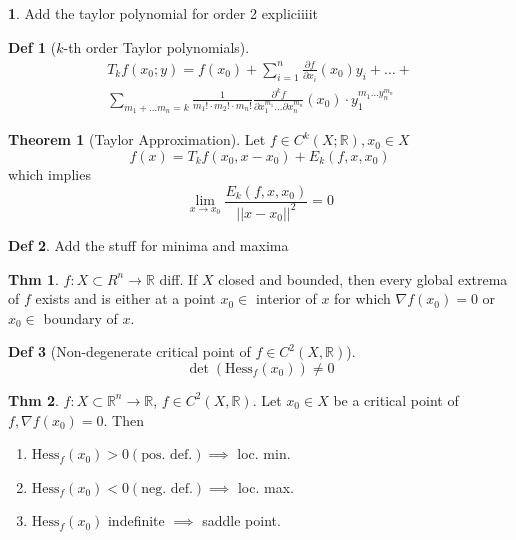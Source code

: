 \documentclass[a4paper, 10pt]{article}
\theoremstyle{definition}
\newtheorem*{theorem}{Thm}
\newtheorem*{definition}{Def}
\theoremstyle{colored}
\newtheorem*{note_wrapper}{}
\theoremstyle{ex}
\theoremstyle{named}
\newtheorem*{ntheorem_wrapper}{Theorem}
\newenvironment{ntheorem}%
    {\begin{mdframed}[style=important]\begin{ntheorem_wrapper}}%
    {\end{ntheorem_wrapper}\end{mdframed}}
\newenvironment{note}%
    {\begin{mdframed}[style=trick]\begin{note_wrapper}}%
    {\end{note_wrapper}\end{mdframed}}
\newcommand{\R}{\mathbb{R}}
\begin{document}
\begin{note}
    Add the taylor polynomial for order 2 expliciiiit
\end{note}

\begin{definition}[\(k\)-th order Taylor polynomials]
    \begin{multline*}
        T_kf(x_0;y) = f(x_0) + \sum_{i = 1}^n \frac{\partial f}{\partial x_i} (x_0) y_i + \ldots + \\ \sum_{m_1 + \ldots m_n = k} \frac{1}{m_1! \cdot m_2! \cdot m_n!} \frac{\partial^k f}{\partial x_1^{m_1} \ldots \partial x_n^{m_n}}(x_0) \cdot y_1^{m_1 \ldots y_n^{m_n}}
    \end{multline*}
\end{definition}

\begin{ntheorem}[Taylor Approximation]
    Let \(f \in C^k(X; \R), x_0 \in X\)
    \[f(x) = T_k f(x_0, x - x_0) + E_k(f, x, x_0)\]
    which implies
    \[\lim_{x \to x_0} \frac{E_k(f, x, x_0)}{||x - x_0||^2} = 0\]
\end{ntheorem}

\begin{definition}
    Add the stuff for minima and maxima
\end{definition}

\begin{theorem}
    \(f: X \subset R^n \to \R\) diff. If \(X\) closed and bounded, then every global extrema of \(f\) exists and is either at a point \(x_0 \in\) interior of \(x\) for which \(\nabla f(x_0) = 0\) or \(x_0 \in\) boundary of \(x\).
\end{theorem}

\begin{definition}[Non-degenerate critical point of \(f \in C^2(X, \R)\)]
    \[\det(\text{Hess}_f(x_0)) \neq 0\]
\end{definition}

\begin{theorem}
    \(f: X \subset \R^n \to \R\), \(f \in C^2(X, \R)\). Let \(x_0 \in X\) be a critical point of \(f, \nabla f(x_0) = 0\). Then
    \begin{enumerate}
        \item \(\text{Hess}_f(x_0) > 0 (\text{pos. def.}) \implies\) loc. min.
        \item \(\text{Hess}_f(x_0) < 0 (\text{neg. def.}) \implies\) loc. max.
        \item \(\text{Hess}_f(x_0)\) indefinite \(\implies\) saddle point.
    \end{enumerate}
\end{theorem}
\end{document}
